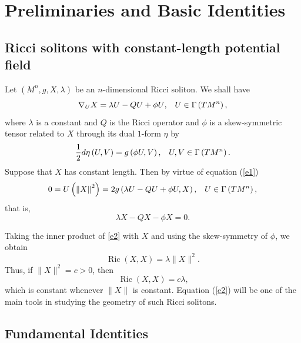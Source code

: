 \documentclass[a4paper, twoside, 10pt]{article}
\numberwithin{equation}{section}
\theoremstyle{definition}
\begin{document}
\section{Preliminaries and Basic Identities}


\subsection{Ricci solitons with constant-length potential field}
Let $\left(M^{n},g,X, \lambda \right) $ be an $n$-dimensional Ricci soliton.
We shall have
\begin{equation}\label{e1}
{\nabla} _{U}X=\lambda U-QU+\phi U\text{,\quad }U\in \Gamma \left(
TM^{n}\right) \text{,}  
\end{equation}
where $\lambda $ is a constant and $Q$ is the Ricci operator and $\phi$ is a skew-symmetric tensor related to $X$ through its dual $1$-form $\eta$ by
\[
\frac{1}{2}d\eta \left( U,V\right) =g\left( \phi U,V\right) \text{,\quad }%
U,V\in \Gamma \left( TM^{n}\right) \text{.}
\]
Suppose that $X$ has constant length. Then by virtue of equation (\ref{e1})
\[
0=U\left( \left\Vert X\right\Vert ^{2}\right) =2g\left( \lambda U-QU+\phi
U,X\right) \text{,\quad }U\in \Gamma \left( TM^{n}\right) \text{,}
\]
that is,
\begin{equation}\label{e2}
\lambda X-QX -\phi X=0\text{.}  
\end{equation}


Taking the inner product of \eqref{e2} with $X$ and using the
skew-symmetry of $\phi$, we obtain
\[
\operatorname{Ric}(X,X)=\lambda \|X\|^2.
\]
Thus, if $\|X\|^2=c>0$, then
\begin{equation}\label{e3}
\operatorname{Ric}\left( X,X\right) =c\lambda \text{,}  
\end{equation}
which is constant whenever $\|X\|$ is constant. Equation (\ref{e2}) will be one of the main tools in studying the geometry of such Ricci solitons.


\subsection{Fundamental Identities}
\end{document}
